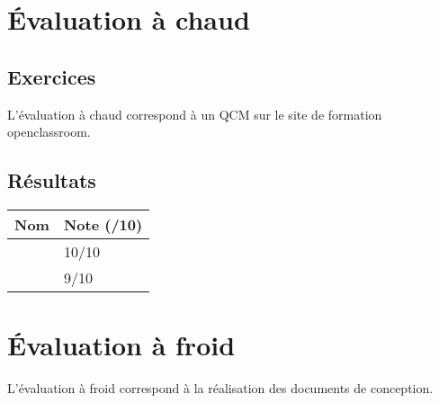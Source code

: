 \documentclass[asi, sansVersion]{picInsa}
\begin{document}
	\newpage
	\section*{Évaluation à chaud}
		\subsection*{Exercices}
		L'évaluation à chaud correspond à un QCM sur le site de formation openclassroom.

			
		\subsection*{Résultats}
			\begin{longtable}{|p{0.5\textwidth}|p{}|}
				\hline
					\rowcolor[gray]{0.90} Nom & Note (/10) \\
				\hline
					\Mathieu &  10/10\\
				\hline
					\Julie &  9/10\\
				\hline
			
			\end{longtable}
			
	\newpage
	\section*{Évaluation à froid}
		L'évaluation à froid correspond à la réalisation des documents de conception.
\end{document}

